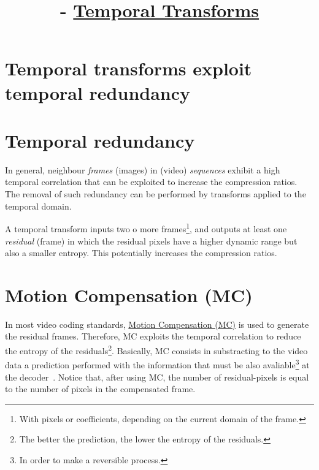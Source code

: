 


\title{\SM{} - \href{https://github.com/Sistemas-Multimedia/Sistemas-Multimedia.github.io/tree/master/contents/temporal_transforms}{Temporal Transforms}}

\maketitle
\tableofcontents

\section{Temporal transforms exploit temporal redundancy}


\section{Temporal redundancy}

In general, neighbour \emph{frames} (images) in (video)
\emph{sequences} exhibit a high temporal correlation that can be
exploited to increase the compression ratios. The removal of such
redundancy can be performed by transforms applied to the temporal
domain.

A temporal transform inputs two o more frames\footnote{With pixels or
coefficients, depending on the current domain of the frame.}, and
outputs at least one \emph{residual} (frame) in which the
residual pixels have a higher dynamic range but also a smaller
entropy. This potentially increases the compression ratios.


\section{Motion Compensation (MC)}

In most video coding standards,
\href{https://en.wikipedia.org/wiki/Motion_compensation}{Motion
  Compensation (MC)} is used to generate the residual
frames. Therefore, MC exploits the temporal correlation to reduce the
entropy of the residuals\footnote{The better the prediction, the lower
  the entropy of the residuals.}. Basically, MC consists in
substracting to the video data a prediction performed with the
information that must be also avaliable\footnote{In order to make a
  reversible process.} at the decoder~\cite{vruiz__MC}. Notice that,
after using MC, the number of residual-pixels is equal to the number
of pixels in the compensated frame.

